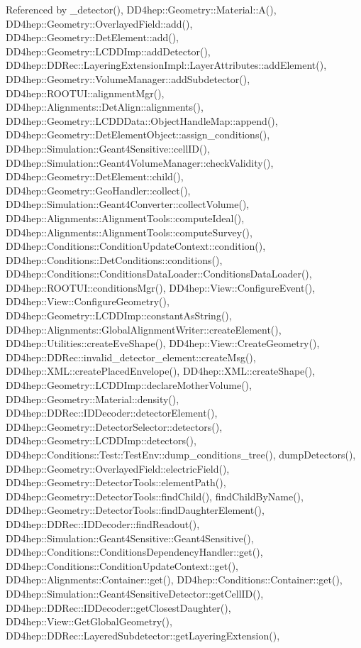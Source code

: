Referenced by \+\_\+detector(), D\+D4hep\+::\+Geometry\+::\+Material\+::\+A(), D\+D4hep\+::\+Geometry\+::\+Overlayed\+Field\+::add(), D\+D4hep\+::\+Geometry\+::\+Det\+Element\+::add(), D\+D4hep\+::\+Geometry\+::\+L\+C\+D\+D\+Imp\+::add\+Detector(), D\+D4hep\+::\+D\+D\+Rec\+::\+Layering\+Extension\+Impl\+::\+Layer\+Attributes\+::add\+Element(), D\+D4hep\+::\+Geometry\+::\+Volume\+Manager\+::add\+Subdetector(), D\+D4hep\+::\+R\+O\+O\+T\+U\+I\+::alignment\+Mgr(), D\+D4hep\+::\+Alignments\+::\+Det\+Align\+::alignments(), D\+D4hep\+::\+Geometry\+::\+L\+C\+D\+D\+Data\+::\+Object\+Handle\+Map\+::append(), D\+D4hep\+::\+Geometry\+::\+Det\+Element\+Object\+::assign\+\_\+conditions(), D\+D4hep\+::\+Simulation\+::\+Geant4\+Sensitive\+::cell\+I\+D(), D\+D4hep\+::\+Simulation\+::\+Geant4\+Volume\+Manager\+::check\+Validity(), D\+D4hep\+::\+Geometry\+::\+Det\+Element\+::child(), D\+D4hep\+::\+Geometry\+::\+Geo\+Handler\+::collect(), D\+D4hep\+::\+Simulation\+::\+Geant4\+Converter\+::collect\+Volume(), D\+D4hep\+::\+Alignments\+::\+Alignment\+Tools\+::compute\+Ideal(), D\+D4hep\+::\+Alignments\+::\+Alignment\+Tools\+::compute\+Survey(), D\+D4hep\+::\+Conditions\+::\+Condition\+Update\+Context\+::condition(), D\+D4hep\+::\+Conditions\+::\+Det\+Conditions\+::conditions(), D\+D4hep\+::\+Conditions\+::\+Conditions\+Data\+Loader\+::\+Conditions\+Data\+Loader(), D\+D4hep\+::\+R\+O\+O\+T\+U\+I\+::conditions\+Mgr(), D\+D4hep\+::\+View\+::\+Configure\+Event(), D\+D4hep\+::\+View\+::\+Configure\+Geometry(), D\+D4hep\+::\+Geometry\+::\+L\+C\+D\+D\+Imp\+::constant\+As\+String(), D\+D4hep\+::\+Alignments\+::\+Global\+Alignment\+Writer\+::create\+Element(), D\+D4hep\+::\+Utilities\+::create\+Eve\+Shape(), D\+D4hep\+::\+View\+::\+Create\+Geometry(), D\+D4hep\+::\+D\+D\+Rec\+::invalid\+\_\+detector\+\_\+element\+::create\+Msg(), D\+D4hep\+::\+X\+M\+L\+::create\+Placed\+Envelope(), D\+D4hep\+::\+X\+M\+L\+::create\+Shape(), D\+D4hep\+::\+Geometry\+::\+L\+C\+D\+D\+Imp\+::declare\+Mother\+Volume(), D\+D4hep\+::\+Geometry\+::\+Material\+::density(), D\+D4hep\+::\+D\+D\+Rec\+::\+I\+D\+Decoder\+::detector\+Element(), D\+D4hep\+::\+Geometry\+::\+Detector\+Selector\+::detectors(), D\+D4hep\+::\+Geometry\+::\+L\+C\+D\+D\+Imp\+::detectors(), D\+D4hep\+::\+Conditions\+::\+Test\+::\+Test\+Env\+::dump\+\_\+conditions\+\_\+tree(), dump\+Detectors(), D\+D4hep\+::\+Geometry\+::\+Overlayed\+Field\+::electric\+Field(), D\+D4hep\+::\+Geometry\+::\+Detector\+Tools\+::element\+Path(), D\+D4hep\+::\+Geometry\+::\+Detector\+Tools\+::find\+Child(), find\+Child\+By\+Name(), D\+D4hep\+::\+Geometry\+::\+Detector\+Tools\+::find\+Daughter\+Element(), D\+D4hep\+::\+D\+D\+Rec\+::\+I\+D\+Decoder\+::find\+Readout(), D\+D4hep\+::\+Simulation\+::\+Geant4\+Sensitive\+::\+Geant4\+Sensitive(), D\+D4hep\+::\+Conditions\+::\+Conditions\+Dependency\+Handler\+::get(), D\+D4hep\+::\+Conditions\+::\+Condition\+Update\+Context\+::get(), D\+D4hep\+::\+Alignments\+::\+Container\+::get(), D\+D4hep\+::\+Conditions\+::\+Container\+::get(), D\+D4hep\+::\+Simulation\+::\+Geant4\+Sensitive\+Detector\+::get\+Cell\+I\+D(), D\+D4hep\+::\+D\+D\+Rec\+::\+I\+D\+Decoder\+::get\+Closest\+Daughter(), D\+D4hep\+::\+View\+::\+Get\+Global\+Geometry(), D\+D4hep\+::\+D\+D\+Rec\+::\+Layered\+Subdetector\+::get\+Layering\+Extension(), 